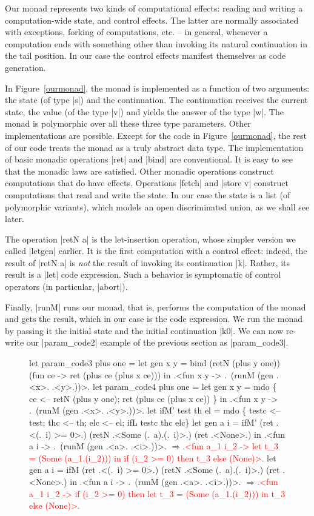 \documentclass{llncs}
\newcommand{\evalresult}[1]{\ensuremath{\Longrightarrow}\textcolor{red}{#1}}
\begin{document}
Our monad represents two kinds of computational effects: reading and
writing a computation-wide state, and control effects. The latter are
normally associated with exceptions, forking of computations, etc. --
in general, whenever a computation ends with something other than
invoking its natural continuation in the tail position. In our case
the control effects manifest themselves as code generation.

In Figure~\ref{ourmonad}, the monad is implemented as a function of two
arguments: the state (of type |s|) and the continuation. The
continuation receives the current state, the value (of the type |v|) and
yields the answer of the type |w|.  The monad is polymorphic over all
these three type parameters.  Other implementations are
possible. Except for the code in Figure~\ref{ourmonad}, the rest of our code
treats the monad as a truly abstract data type. The implementation of basic
monadic operations |ret| and |bind| are conventional. It is easy to
see that the monadic laws are satisfied.  Other monadic operations
construct computations that do have effects.  Operations |fetch| and
|store v| construct computations that read and write the state. In our
case the state is a list (of polymorphic variants), which models an
open discriminated union, as we shall see later.

The operation |retN a| is the let-insertion operation, whose simpler
version we called |letgen| earlier. It is the first computation with
a control effect: indeed, the result of |retN a| is \emph{not} the
result of invoking its continuation |k|. Rather, its result is a |let|
code expression. Such a behavior is symptomatic of control operators
(in particular, |abort|).

Finally, |runM| runs our monad, that is, performs the computation of
the monad and gets the result, which in our case is the code
expression. We run the monad by passing it the initial state and the
initial continuation |k0|. We can now re-write our |param_code2|
example of the previous section as |param_code3|.

\begin{figure}
\begin{code}
let param_code3 plus one =
  let gen x y = bind (retN (plus y one)) (fun ce -> 
                ret (plus ce (plus x ce)))
  in .<fun x y -> .~(runM (gen .<x>. .<y>.))>.
let param_code4 plus one =
  let gen x y = mdo \{ ce <-- retN (plus y one);
                      ret (plus ce (plus x ce)) \}
  in .<fun x y -> .~(runM (gen .<x>. .<y>.))>.
let ifM' test th el = mdo \{
  testc <-- test; thc <-- th; elc <-- el;
  ifL testc thc elc\}
let gen a i = ifM' (ret .<(.~i) >= 0>.) 
                   (retN .<Some (.~a).(.~i)>.) (ret .<None>.)
 in .<fun a i -> .~(runM (gen .<a>. .<i>.))>.
\evalresult{.<fun a_1 i_2 ->  
let t_3 = (Some (a_1.(i_2))) in if (i_2 >= 0) then t_3 else (None)>.}
let gen a i = ifM (ret .<(.~i) >= 0>.) 
                  (retN .<Some (.~a).(.~i)>.) (ret .<None>.)
 in .<fun a i -> .~(runM (gen .<a>. .<i>.))>.
\evalresult{.<fun a_1 i_2 -> 
if (i_2 >= 0) then let t_3 = (Some (a_1.(i_2))) in t_3 else (None)>.}
\end{code}
\end{figure}
\end{document}
